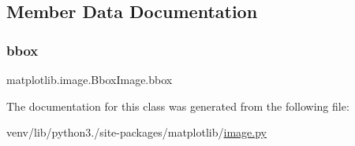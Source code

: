 \subsection{Member Data Documentation}
\mbox{\label{classmatplotlib_1_1image_1_1BboxImage_abc42134894f4c67c3b23189c2f152118}} 
\subsubsection{\texorpdfstring{bbox}{bbox}}
{\footnotesize\ttfamily matplotlib.\+image.\+Bbox\+Image.\+bbox}



The documentation for this class was generated from the following file\+:\begin{DoxyCompactItemize}
\item 
venv/lib/python3./site-\/packages/matplotlib/\hyperlink{image_8py}{image.\+py}\end{DoxyCompactItemize}
